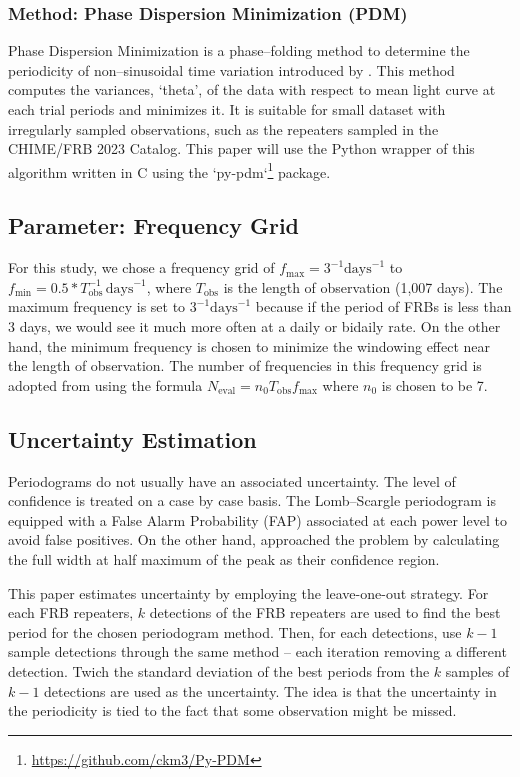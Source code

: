 \documentclass[reprint,amsmath,amssymb,showkeys,prd]{revtex4-2}
\begin{document}
\subsubsection{Method: Phase Dispersion Minimization (PDM)}

Phase Dispersion Minimization is a phase--folding method to determine the periodicity of non--sinusoidal time variation introduced by \citet{stellingwerf_PeriodDeterminationUsing_1978}. 
This method computes the variances, `theta', of the data with respect to mean light curve at each trial periods and minimizes it.
It is suitable for small dataset with irregularly sampled observations, such as the repeaters sampled in the CHIME/FRB 2023 Catalog.
This paper will use the Python wrapper of this algorithm written in C using the `py-pdm`\footnote{\url{https://github.com/ckm3/Py-PDM}} package.

\subsection{Parameter: Frequency Grid}

For this study, we chose a frequency grid of $f_\text{max} = 3^{-1} \text{days}^{-1}$ to $f_\text{min} = 0.5 * T_\text{obs}^{-1}\, \text{days}^{-1}$, where $T_\text{obs}$ is the length of observation (1,007 days).
The maximum frequency is set to $3^{-1} \text{days}^{-1}$ because if the period of FRBs is less than 3 days, we would see it much more often at a daily or bidaily rate.
On the other hand, the minimum frequency is chosen to minimize the windowing effect near the length of observation.
The number of frequencies in this frequency grid is adopted from \citet{vanderplas_UnderstandingLombScargle_2018} using the formula $N_\text{eval}=n_0T_\text{obs}f_\text{max}$ where $n_0$ is chosen to be 7.

\subsection{Uncertainty Estimation}

Periodograms do not usually have an associated uncertainty.
The level of confidence is treated on a case by case basis.
The Lomb--Scargle periodogram is equipped with a False Alarm Probability (FAP) associated at each power level to avoid false positives.
On the other hand, \citet{rajwade_PossiblePeriodicActivity_2020} approached the problem by calculating the full width at half maximum of the peak as their confidence region.

This paper estimates uncertainty by employing the leave-one-out strategy.
For each FRB repeaters, $k$ detections of the FRB repeaters are used to find the best period for the chosen periodogram method.
Then, for each detections, use $k-1$ sample detections through the same method -- each iteration removing a different detection.
Twich the standard deviation of the best periods from the $k$ samples of $k-1$ detections are used as the uncertainty.
The idea is that the uncertainty in the periodicity is tied to the fact that some observation might be missed.
\end{document}
